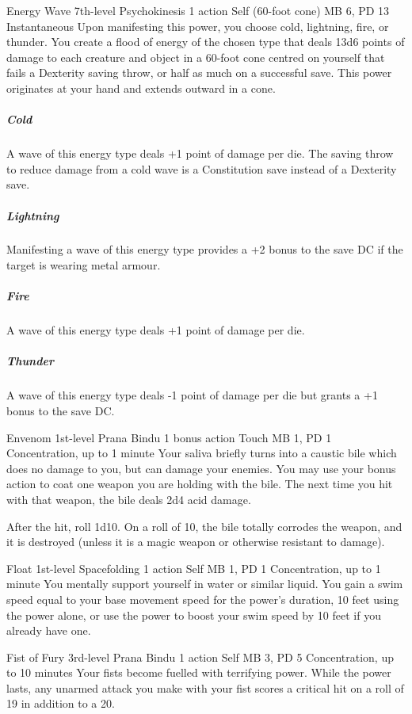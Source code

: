 \DndPowerHeader%
  {Energy Wave}
  {7th-level Psychokinesis}
  {1 action}
  {Self (60-foot cone)}
  {MB 6, PD 13}
  {Instantaneous}
  Upon manifesting this power,
  you choose cold, lightning, fire, or thunder.
  You create a flood of energy of the chosen type
  that deals 13d6 points of damage
  to each creature and object in a 60-foot cone
  centred on yourself
  that fails a Dexterity saving throw,
  or half as much on a successful save.
  This power originates at your hand
  and extends outward in a cone.
  \subparagraph{Cold}
    A wave of this energy type deals +1 point
    of damage per die.
    The saving throw to reduce damage from a cold wave
    is a Constitution save instead of a Dexterity save.  
  \subparagraph{Lightning}
    Manifesting a wave of this energy type
    provides a +2 bonus to the save DC if the target is wearing
    metal armour.
  \subparagraph{Fire}
    A wave of this energy type deals +1 point of damage per die.
  \subparagraph{Thunder}
    A wave of this energy type deals -1 point of damage per die
    but grants a +1 bonus to the save DC.

\DndPowerHeader%
  {Envenom}
  {1st-level Prana Bindu}
  {1 bonus action}
  {Touch}
  {MB 1, PD 1}
  {Concentration, up to 1 minute}
Your saliva briefly turns into a caustic bile
which does no damage to you,
but can damage your enemies.
You may use your bonus action to coat one weapon
you are holding with the bile.
The next time you hit with that weapon,
the bile deals 2d4 acid damage.

After the hit, roll 1d10.
On a roll of 10,
the bile totally corrodes the weapon,
and it is destroyed
(unless it is a magic weapon or otherwise resistant
to damage).

\DndPowerHeader%
  {Float}
  {1st-level Spacefolding}
  {1 action}
  {Self}
  {MB 1, PD 1}
  {Concentration, up to 1 minute}
You mentally support yourself in water or similar liquid.
You gain a swim speed equal to your base movement speed for
the power's duration, 10 feet using the power alone,
or use the power to boost your swim speed by 10 feet if you already have one.

\DndPowerHeader%
  {Fist of Fury}
  {3rd-level Prana Bindu}
  {1 action}
  {Self}
  {MB 3, PD 5}
  {Concentration, up to 10 minutes}
Your fists become fuelled with terrifying power.
While the power lasts,
any unarmed attack you make with your fist
scores a critical hit on a roll of
19 in addition to a 20.

